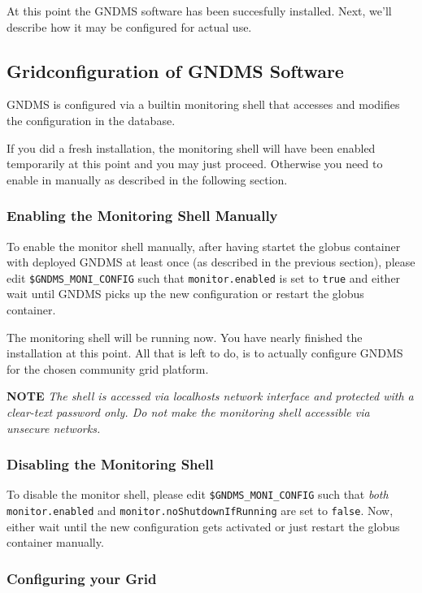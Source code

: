 \documentclass{article}
\begin{document}
At this point the GNDMS software has been succesfully installed.
Next, we'll describe how it may be configured for actual use.

\subsection{Gridconfiguration of GNDMS Software}

GNDMS is configured via a builtin monitoring shell that accesses
and modifies the configuration in the database.

If you did a fresh installation, the monitoring shell will have
been enabled temporarily at this point and you may just proceed.
Otherwise you need to enable in manually as described in the
following section.

\subsubsection{Enabling the Monitoring Shell Manually}

To enable the monitor shell manually, after having startet the
globus container with deployed GNDMS at least once (as described in
the previous section), please edit \verb!$GNDMS_MONI_CONFIG! such
that \verb!monitor.enabled! is set to \verb!true! and either wait
until GNDMS picks up the new configuration or restart the globus
container.

The monitoring shell will be running now. You have nearly finished
the installation at this point. All that is left to do, is to
actually configure GNDMS for the chosen community grid platform.

\textbf{NOTE}
\emph{The shell is accessed via localhosts network interface and protected with a clear-text password only. Do not make the monitoring shell accessible via unsecure networks.}

\subsubsection{Disabling the Monitoring Shell}

To disable the monitor shell, please edit \verb!$GNDMS_MONI_CONFIG!
such that \emph{both} \verb!monitor.enabled! and
\verb!monitor.noShutdownIfRunning! are set to \verb!false!. Now,
either wait until the new configuration gets activated or just
restart the globus container manually.

\subsubsection{Configuring your Grid}
\end{document}
